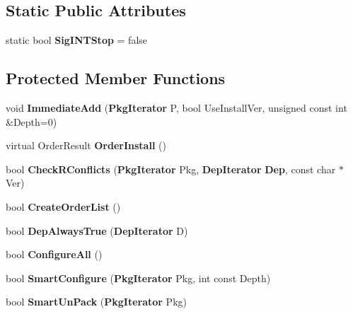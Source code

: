 \subsection*{\-Static \-Public \-Attributes}
\begin{DoxyCompactItemize}
\item 
static bool {\bfseries \-Sig\-I\-N\-T\-Stop} = false\label{classpkgPackageManager_a9dd946780196f19cbda95b17140fda1c}

\end{DoxyCompactItemize}
\subsection*{\-Protected \-Member \-Functions}
\begin{DoxyCompactItemize}
\item 
void {\bfseries \-Immediate\-Add} ({\bf \-Pkg\-Iterator} \-P, bool \-Use\-Install\-Ver, unsigned const int \&\-Depth=0)\label{classpkgPackageManager_a6c72ba522f3591ab6af328821800dab3}

\item 
virtual \-Order\-Result {\bfseries \-Order\-Install} ()\label{classpkgPackageManager_aac426546448bf095379bca9cac358841}

\item 
bool {\bfseries \-Check\-R\-Conflicts} ({\bf \-Pkg\-Iterator} \-Pkg, {\bf \-Dep\-Iterator} {\bf \-Dep}, const char $\ast$\-Ver)\label{classpkgPackageManager_a6f764edee5890dc9815fd5db4313eab9}

\item 
bool {\bfseries \-Create\-Order\-List} ()\label{classpkgPackageManager_a9bfaa5b98474bdc8f84e82ce512696c4}

\item 
bool {\bfseries \-Dep\-Always\-True} ({\bf \-Dep\-Iterator} \-D)\label{classpkgPackageManager_a3c22baf91a10ce9c56d322bbb93968c8}

\item 
bool {\bfseries \-Configure\-All} ()\label{classpkgPackageManager_ae135d22856534a0d55a4c92c618ff826}

\item 
bool {\bfseries \-Smart\-Configure} ({\bf \-Pkg\-Iterator} \-Pkg, int const \-Depth)\label{classpkgPackageManager_afed4808cf41ee3c64ff995fa1e54416c}

\item 
bool {\bfseries \-Smart\-Un\-Pack} ({\bf \-Pkg\-Iterator} \-Pkg)\label{classpkgPackageManager_ac170a3f5cf962669edc3a1b06172c730}


\end{DoxyCompactItemize}
